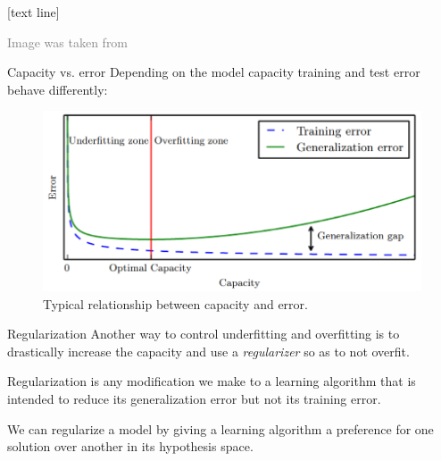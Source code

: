 \documentclass[dvipsnames]{beamer}
\newcommand{\referencefootnote}[1]{\setbeamertemplate{footline}[text line]{%
\parbox{0.9\paperwidth}{\vspace*{-23pt}\tiny{\textcolor{gray}{#1}}\hfill\scriptsize\insertframenumber}}}
\begin{document}
{ \referencefootnote{Image was taken from \cite{Goodfellow_et_al_2016}}
\begin{frame}{Capacity vs. error}
Depending on the model capacity training and test error behave differently:
 \begin{figure}
		\center
		\includegraphics[scale=.4]{figures/capacity.png} 
		\caption{Typical relationship between capacity and error.}
	\end{figure}
\end{frame}
}
\begin{frame}{Regularization}
	Another way to control underfitting and overfitting is to drastically increase the capacity and use a \emph{regularizer} so as to not overfit. %
	
	Regularization is any modiﬁcation we make to a learning algorithm that is intended to reduce its generalization error but not its
training error. %
	
	We can regularize a model by giving a learning algorithm a preference for one solution over another in its hypothesis space.
\end{frame}
\end{document}
